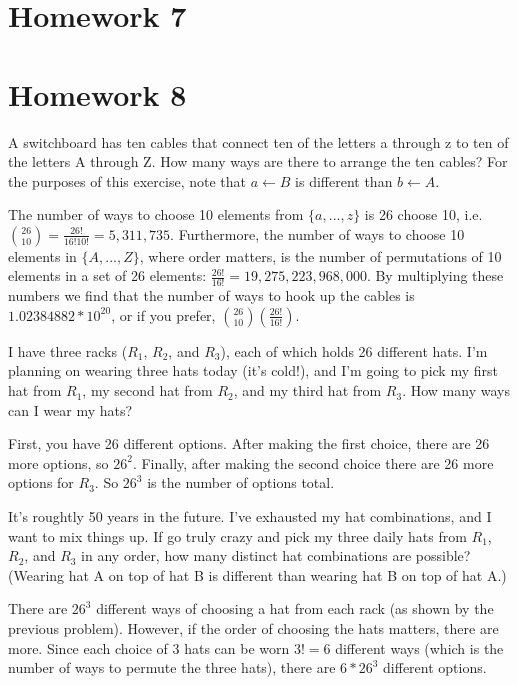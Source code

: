 \section{Homework 7}

\section{Homework 8}
\begin{problem}
A switchboard has ten cables that connect ten of the letters a through z to ten of the letters A through Z. How many ways are there to arrange the ten cables? For the purposes of this exercise,
note that $a\leftarrow B$ is different than $b\leftarrow A$.

\solution
The number of ways to choose 10 elements from $\{ a,. . ., z\}$ is 26 choose 10, i.e. ${26 \choose 10} = {\frac {26!}{16!10!}}= {5,311,735}$. Furthermore, the number of ways to choose 10 elements in $\{A,. . . , Z\}$, where order matters, is the number of permutations of 10 elements in a set of 26 elements: ${\frac {26!}{16!}}= {19,275,223,968,000}$. By multiplying these numbers we find that the number of ways to hook up the cables is $1.02384882*10^{20}$, or if you prefer, ${26 \choose 10}({\frac{26!}{16!}})$. 

\begin{problem}
I have three racks ($R_{1}$, $R_{2}$, and $R_{3}$), each of which holds 26 different hats. I’m planning on wearing
three hats today (it’s cold!), and I’m going to pick my first hat from $R_{1}$, my second hat from $R_{2}$,
and my third hat from $R_{3}$. How many ways can I wear my hats?

\solution
First, you have 26 different options. After making the first choice, there are 26 more options, so $26^{2}$. Finally, after making the second choice there are 26 more options for $R_{3}$. So $26^{3}$ is the number of options total.

\begin{problem}
It’s roughtly 50 years in the future. I’ve exhausted my hat combinations, and I want to mix things
up. If go truly crazy and pick my three daily hats from $R_{1}$, $R_{2}$, and $R_{3}$ in any order, how many
distinct hat combinations are possible? (Wearing hat A on top of hat B is different than wearing
hat B on top of hat A.)

\solution
There are $26^{3}$ different ways of choosing a hat from each rack (as shown by the previous problem). However, if the order of choosing the hats matters, there are more. Since each choice of 3 hats can be worn $3!=6$ different ways (which is the number of ways to permute the three hats), there are $6*26^{3}$ different options.



\end{problem}
\end{problem}
\end{problem}
